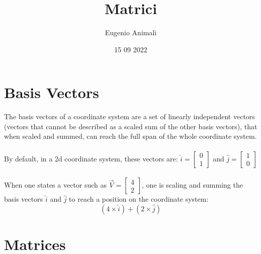 \documentclass{article}
\title{Matrici}
\author{Eugenio Animali}
\date{15 09 2022}
\begin{document}
\maketitle

\section{Basis Vectors}

The basis vectors of a coordinate system are a set of linearly independent vectors (vectors that cannot be described as a scaled sum of the other basis vectors), that when scaled and summed, can reach the full span of the whole coordinate system.
\\ \\
By default, in a 2d coordinate system, these vectors are: $\hat{i} = \begin{bmatrix}0\\1\end{bmatrix}$ and $\hat{j} = \begin{bmatrix}
1\\0\end{bmatrix}$
\\ \\
When one states a vector such as $\vec{V} = \begin{bmatrix}4\\2\end{bmatrix}$, one is scaling and summing the basis vectors $\hat{i}$ and $\hat{j}$ to reach a position on the coordinate system:
\[
(4\times\hat{i}) + (2\times\hat{j})
\]

\section{Matrices}
\end{document}
